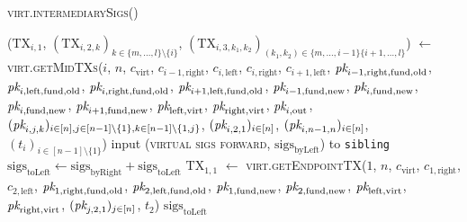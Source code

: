 \begin{center}
  \begin{processbox}{\textsc{virt.intermediarySigs}()}
    \begin{algorithmic}[1]
      \State ($\mathrm{TX}_{i, 1}$, $(\mathrm{TX}_{i, 2, k})_{k \in \{m, \dots,
      l\} \setminus \{i\}}$, $(\mathrm{TX}_{i, 3, k_1, k_2})_{(k_1, k_2) \in
      \{m, \dots, i-1\} \{i+1, \dots, l\}}$) $\gets$
      \textsc{virt.getMidTXs}($i$, $n$, $c_{\mathrm{virt}}$, $c_{i-1,
      \mathrm{right}}$, $c_{i, \mathrm{left}}$, $c_{i, \mathrm{right}}$,
      $c_{i+1, \mathrm{left}}$, $\textit{pk}_{i-1, \mathrm{right}, \mathrm{fund},
      \mathrm{old}}$, $\textit{pk}_{i, \mathrm{left}, \mathrm{fund}, \mathrm{old}}$,
      $\textit{pk}_{i, \mathrm{right}, \mathrm{fund}, \mathrm{old}}$, $\textit{pk}_{i+1,
      \mathrm{left}, \mathrm{fund}, \mathrm{old}}$, $\textit{pk}_{i-1, \mathrm{fund},
      \mathrm{new}}$, $\textit{pk}_{i, \mathrm{fund}, \mathrm{new}}$, $\textit{pk}_{i,
      \mathrm{fund}, \mathrm{new}}$, $\textit{pk}_{i+1, \mathrm{fund}, \mathrm{new}}$,
      $\textit{pk}_{\mathrm{left}, \mathrm{virt}}$, $\textit{pk}_{\mathrm{right}, \mathrm{virt}}$,
      $\textit{pk}_{i, \mathrm{out}}$, $(\textit{pk}_{i,j,k})_{i \in [n], j \in [n-1] \setminus
      \{1\}, k \in [n-1] \setminus \{1, j\}}$, $(\textit{pk}_{i, 2, 1})_{i \in [n]}$,
      $(\textit{pk}_{i, n-1, n})_{i \in [n]}$, $(t_i)_{i \in [n-1] \setminus \{1\}}$)
      \State {}
      \State input (\textsc{virtual sigs forward},
      $\mathrm{sigs}_{\mathrm{byLeft}}$) to \texttt{sibling}
      \State {}
      \State $\mathrm{sigs}_{\mathrm{toLeft}} \gets
      \mathrm{sigs}_{\mathrm{byRight}} + \mathrm{sigs}_{\mathrm{toLeft}}$
       
        \State $\mathrm{TX}_{1, 1}$ $\gets$ \textsc{virt.getEndpointTX}($1$,
        $n$, $c_{\mathrm{virt}}$, $c_{1, \mathrm{right}}$, $c_{2,
        \mathrm{left}}$, $\textit{pk}_{1, \mathrm{right}, \mathrm{fund}, \mathrm{old}}$,
        $\textit{pk}_{2, \mathrm{left}, \mathrm{fund}, \mathrm{old}}$, $\textit{pk}_{1,
        \mathrm{fund}, \mathrm{new}}$, $\textit{pk}_{2, \mathrm{fund}, \mathrm{new}}$,
        $\textit{pk}_{\mathrm{left}, \mathrm{virt}}$, $\textit{pk}_{\mathrm{right},
        \mathrm{virt}}$, $(\textit{pk}_{j, 2, 1})_{j \in [n]}$, $t_2$)
      \EndIf
      \State \Return $\mathrm{sigs}_{\mathrm{toLeft}}$
    \end{algorithmic}
  \end{processbox}
  \label{code:virtual-layer:intermediary-sigs}
\end{center} \ \\

